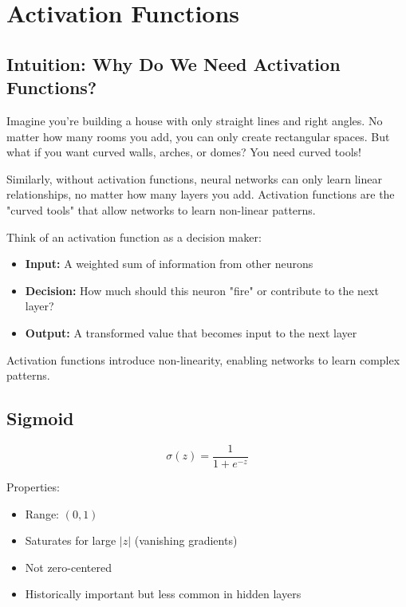
\section{Activation Functions}
\label{sec:activation-functions}

\subsection{Intuition: Why Do We Need Activation Functions?}

Imagine you're building a house with only straight lines and right angles. No matter how many rooms you add, you can only create rectangular spaces. But what if you want curved walls, arches, or domes? You need curved tools!

Similarly, without activation functions, neural networks can only learn linear relationships, no matter how many layers you add. Activation functions are the "curved tools" that allow networks to learn non-linear patterns.

Think of an activation function as a decision maker:
\begin{itemize}
    \item \textbf{Input:} A weighted sum of information from other neurons
    \item \textbf{Decision:} How much should this neuron "fire" or contribute to the next layer?
    \item \textbf{Output:} A transformed value that becomes input to the next layer
\end{itemize}

Activation functions introduce non-linearity, enabling networks to learn complex patterns.

\subsection{Sigmoid}

\begin{equation}
\sigma(z) = \frac{1}{1 + e^{-z}}
\end{equation}

Properties:
\begin{itemize}
    \item Range: $(0, 1)$
    \item Saturates for large $|z|$ (vanishing gradients)
    \item Not zero-centered
    \item Historically important but less common in hidden layers
\end{itemize}

